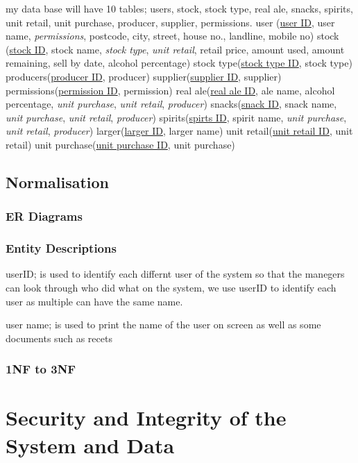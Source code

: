 my data base will have 10 tables; users, stock, stock type, real ale, snacks, spirits, unit retail, unit purchase, producer, supplier, permissions.
user (\underline{user ID}, user name, \emph{permissions}, postcode, city, street, house no., landline, mobile no)
stock (\underline{stock ID}, stock name, \emph{stock type}, \emph{unit retail}, retail price, amount used, amount remaining, sell by date, alcohol percentage)
stock type(\underline{stock type ID}, stock type)
producers(\underline{producer ID}, producer)
supplier(\underline{supplier ID}, supplier)
permissions(\underline{permission ID}, permission)
real ale(\underline{real ale ID}, ale name, alcohol percentage, \emph{unit purchase}, \emph{unit retail}, \emph{producer})
snacks(\underline{snack ID}, snack name, \emph{unit purchase}, \emph{unit retail}, \emph{producer})
spirits(\underline{spirts ID}, spirit name, \emph{unit purchase}, \emph{unit retail}, \emph{producer})
larger(\underline{larger ID}, larger name)
unit retail(\underline{unit retail ID}, unit retail)
unit purchase(\underline{unit purchase ID}, unit purchase)

\subsection{Normalisation}






\subsubsection{ER Diagrams}

\subsubsection{Entity Descriptions}

userID; is used to identify each differnt user of the system so that the manegers can look through who did what on the system, we use userID to identify each user as multiple can have the same name.

user name; is used to print the name of the user on screen as well as some documents such as recets

\subsubsection{1NF to 3NF}

\section{Security and Integrity of the System and Data}

